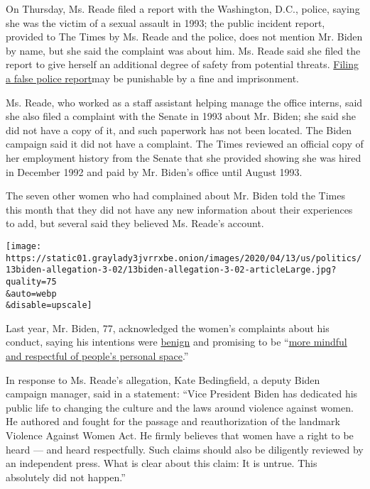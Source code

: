 On Thursday, Ms. Reade filed a report with the Washington, D.C., police,
saying she was the victim of a sexual assault in 1993; the public
incident report, provided to The Times by Ms. Reade and the police, does
not mention Mr. Biden by name, but she said the complaint was about him.
Ms. Reade said she filed the report to give herself an additional degree
of safety from potential threats.
\href{https://code.dccouncil.us/dc/council/code/sections/5-117.05.html}{Filing
a false police report}may be punishable by a fine and imprisonment.

Ms. Reade, who worked as a staff assistant helping manage the office
interns, said she also filed a complaint with the Senate in 1993 about
Mr. Biden; she said she did not have a copy of it, and such paperwork
has not been located. The Biden campaign said it did not have a
complaint. The Times reviewed an official copy of her employment history
from the Senate that she provided showing she was hired in December 1992
and paid by Mr. Biden's office until August 1993.

The seven other women who had complained about Mr. Biden told the Times
this month that they did not have any new information about their
experiences to add, but several said they believed Ms. Reade's account.

\texttt{[image: https://static01.graylady3jvrrxbe.onion/images/2020/04/13/us/politics/13biden-allegation-3-02/13biden-allegation-3-02-articleLarge.jpg?quality=75\\\&auto=webp\\\&disable=upscale]}

Last year, Mr. Biden, 77, acknowledged the women's complaints about his
conduct, saying his intentions were
\href{https://www.nytimes3xbfgragh.onion/2019/04/26/us/politics/biden-the-view.html}{benign}
and promising to be
``\href{https://www.nytimes3xbfgragh.onion/2019/04/03/us/politics/joe-biden-women-video.html}{more
mindful and respectful of people's personal space}.''

In response to Ms. Reade's allegation, Kate Bedingfield, a deputy Biden
campaign manager, said in a statement: ``Vice President Biden has
dedicated his public life to changing the culture and the laws around
violence against women. He authored and fought for the passage and
reauthorization of the landmark Violence Against Women Act. He firmly
believes that women have a right to be heard --- and heard respectfully.
Such claims should also be diligently reviewed by an independent press.
What is clear about this claim: It is untrue. This absolutely did not
happen.''

